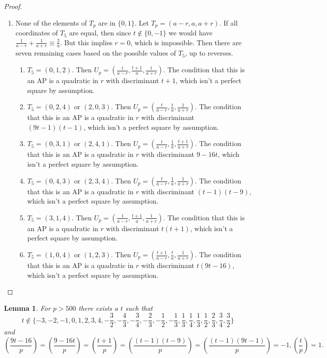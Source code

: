 \documentclass[12pt]{amsart}
\newtheorem{lemma}[thm]{Lemma}
\theoremstyle{definition}
\theoremstyle{remark}
\begin{document}
\begin{proof}
\begin{enumerate}
\item None of the elements of $T_p$ are in $\{0, 1\}$. Let $T_p=(a-r, a, a+r)$. If all coordinates of $T_5$ are equal, then since $t\notin\{0, -1\}$ we would have $\frac{1}{a-r}+\frac{1}{a+r}\equiv \frac{2}{a}$. But this implies $r=0$, which is impossible. Then there are seven remaining cases based on the possible values of $T_5$, up to reverses. 
\begin{enumerate}
\item $T_5=(0, 1, 2)$. Then $U_p=(\frac{t}{a-r}, \frac{t+1}{a}, \frac{t}{a+r})$. The condition that this is an AP is a quadratic in $r$ with discriminant $t+1$, which isn't a perfect square by assumption.
\item $T_5=(0, 2, 4)$ or $(2, 0, 3)$. Then $U_p=(\frac{t}{a-r}, \frac{t}{a}, \frac{1}{a+r})$. The condition that this is an AP is a quadratic in $r$ with discriminant $(9t-1)(t-1)$, which isn't a perfect square by assumption.
\item $T_5=(0, 3, 1)$ or $(2, 4, 1)$. Then $U_p=(\frac{t}{a-r}, \frac{1}{a}, \frac{t+1}{a+r})$. The condition that this is an AP is a quadratic in $r$ with discriminant $9-16t$, which isn't a perfect square by assumption.
\item $T_5=(0, 4, 3)$ or $(2, 3, 4)$.  Then $U_p=(\frac{t}{a-r}, \frac{1}{a}, \frac{1}{a+r})$. The condition that this is an AP is a quadratic in $r$ with discriminant $(t-1)(t-9)$, which isn't a perfect square by assumption.
\item $T_5=(3, 1, 4)$. Then $U_p=(\frac{1}{a-r}, \frac{t+1}{a}, \frac{1}{a+r})$. The condition that this is an AP is a quadratic in $r$ with discriminant $t(t+1)$, which isn't a perfect square by assumption.
\item $T_5=(1, 0, 4)$ or $(1, 2, 3)$. Then $U_p=(\frac{t+1}{a-r}, \frac{t}{a}, \frac{1}{a+r})$. The condition that this is an AP is a quadratic in $r$ with discriminant $t(9t-16)$, which isn't a perfect square by assumption.
\end{enumerate}
\end{enumerate}

\end{proof}
\begin{lemma}
For $p>500$ there exists a $t$ such that
\[t\notin \{-3,-2, -1, 0, 1, 2, 3, 4, -\frac{3}{2}, -\frac{4}{3}, -\frac{3}{4}, -\frac{2}{3}, -\frac{1}{2},-\frac{1}{3},\frac{1}{3}, \frac{1}{4}, \frac{1}{3}, \frac{1}{2},\frac{2}{3}, \frac{3}{4}, \frac{3}{2}\}\]
and 
\[(\frac{9t-16}{p})=(\frac{9-16t}{p})=(\frac{t+1}{p})=(\frac{(t-1)(t-9)}{p})=(\frac{(t-1)(9t-1)}{p})=-1, (\frac{t}{p})=1.\]
\end{lemma}
\end{document}
